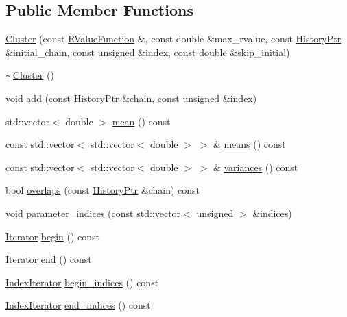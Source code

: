 \subsection*{Public Member Functions}
\begin{DoxyCompactItemize}
\item 
\hyperlink{classeos_1_1Cluster_a0f1f2be34f11be1bba6426ba20ebf999}{Cluster} (const \hyperlink{classeos_1_1Cluster_a0c315d367de4288803597a0f23ee4168}{RValueFunction} \&, const double \&max\_\-rvalue, const \hyperlink{namespaceeos_ac9f30fde04446cfabdd69d4b5b5d3c5a}{HistoryPtr} \&initial\_\-chain, const unsigned \&index, const double \&skip\_\-initial)
\item 
\hyperlink{classeos_1_1Cluster_a7bbc57a377c4d638830c3f4768c0b1b7}{$\sim$Cluster} ()
\item 
void \hyperlink{classeos_1_1Cluster_afed737aab746ba8e3c8fefcf32ea185d}{add} (const \hyperlink{namespaceeos_ac9f30fde04446cfabdd69d4b5b5d3c5a}{HistoryPtr} \&chain, const unsigned \&index)
\item 
std::vector$<$ double $>$ \hyperlink{classeos_1_1Cluster_a9b2fc51a3435f161f359f6a11f02dacb}{mean} () const 
\item 
const std::vector$<$ std::vector$<$ double $>$ $>$ \& \hyperlink{classeos_1_1Cluster_a12f80fe40193349914094f49fbdc18a2}{means} () const 
\item 
const std::vector$<$ std::vector$<$ double $>$ $>$ \& \hyperlink{classeos_1_1Cluster_a16f6b0f61e014b2d89ca532d0bc04cf1}{variances} () const 
\item 
bool \hyperlink{classeos_1_1Cluster_a944a35443f5bfa64317c843c9733d84e}{overlaps} (const \hyperlink{namespaceeos_ac9f30fde04446cfabdd69d4b5b5d3c5a}{HistoryPtr} \&chain) const 
\item 
void \hyperlink{classeos_1_1Cluster_a2906631fc892844e19b661d1484a6a71}{parameter\_\-indices} (const std::vector$<$ unsigned $>$ \&indices)
\item 
\hyperlink{classeos_1_1WrappedForwardIterator}{Iterator} \hyperlink{classeos_1_1Cluster_a07f3b9298b4ea870313f62cce1b9807c}{begin} () const 
\item 
\hyperlink{classeos_1_1WrappedForwardIterator}{Iterator} \hyperlink{classeos_1_1Cluster_a7269794a3f029fb51e08ae51faf5e67f}{end} () const 
\item 
\hyperlink{classeos_1_1WrappedForwardIterator}{IndexIterator} \hyperlink{classeos_1_1Cluster_a81ba073f1dc0d91e0fd0b3060f6cd12d}{begin\_\-indices} () const 
\item 
\hyperlink{classeos_1_1WrappedForwardIterator}{IndexIterator} \hyperlink{classeos_1_1Cluster_a346a8e945ea0be679c9eb372e589619b}{end\_\-indices} () const 
\end{DoxyCompactItemize}


